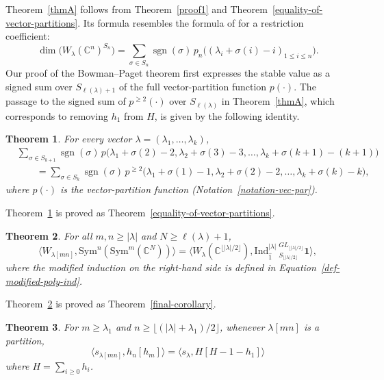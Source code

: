 \documentclass[reqno]{amsart}
\theoremstyle{plain}
\theoremstyle{definition}
\theoremstyle{remark}
\theoremstyle{plain}
\newtheorem{thmx}{Theorem}
\newcommand{\C}{\mathbb{C}}
\DeclareMathOperator{\sgn}{sgn}
\begin{document}
\noindent Theorem~\ref{thmA} follows from Theorem~\ref{proof1} and
Theorem~\ref{equality-of-vector-partitions}. Its formula resembles the formula of
\cite[Corollary~4.2]{narayanan} for a restriction coefficient:
$$\dim\big(W_\lambda(\C^n)^{S_n}\big)=\sum_{\sigma\in S_{n}}\sgn(\sigma)\,
p_n\big((\lambda_i+\sigma(i)-i)_{1\le i\le n}\big).$$
Our proof of the Bowman--Paget theorem first expresses the stable value as a
signed sum over $S_{\ell(\lambda)+1}$ of the full vector-partition function
$p(\cdot)$. The passage to the signed sum of $p^{\ge2}(\cdot)$ over
$S_{\ell(\lambda)}$ in Theorem~\ref{thmA}, which corresponds to removing $h_1$
from $H$, is given by the following identity.

\begin{thmx}\label{thmB}
For every vector $\lambda=(\lambda_1,\dots,\lambda_k)$,
\begin{align*}
&\sum_{\sigma\in S_{k+1}}\sgn(\sigma)\,
p\big(\lambda_1+\sigma(2)-2,\lambda_2+\sigma(3)-3,\dots,\lambda_k+\sigma(k+1)-(k+1)\big)\\
&\qquad=\sum_{\sigma\in S_k}\sgn(\sigma)\,
p^{\geq 2}\big(\lambda_1+\sigma(1)-1,\lambda_2+\sigma(2)-2,\dots,\lambda_k+\sigma(k)-k\big),
\end{align*}
where $p(\cdot)$ is the vector-partition function (Notation~\ref{notation-vec-par}).
\end{thmx}

\noindent Theorem~\ref{thmB} is proved as
Theorem~\ref{equality-of-vector-partitions}.

\begin{thmx}\label{thmC}
For all $m,n\ge|\lambda|$ and $N\ge\ell(\lambda)+1$,
$$\langle W_{\lambda[mn]},\mathrm{Sym}^n(\mathrm{Sym}^m(\C^N))\rangle
=\langle W_\lambda(\C^{\lfloor|\lambda|/2\rfloor}),
\mathrm{Ind}_{\hat{1}}^{|\lambda|}\ _{S_{\lfloor|\lambda|/2\rfloor}}^{GL_{\lfloor|\lambda|/2\rfloor}}\mathbf{1}\rangle,$$
where the modified induction on the right-hand side is defined in
Equation~\eqref{def-modified-poly-ind}.
\end{thmx}

\noindent Theorem~\ref{thmC} is proved as Theorem~\ref{final-corollary}.

\begin{thmx}\label{thmD}
For $m\ge\lambda_1$ and $n\ge\lfloor(|\lambda|+\lambda_1)/2\rfloor$, whenever
$\lambda[mn]$ is a partition,
$$\langle s_{\lambda[mn]}, h_n[h_m]\rangle=\langle s_\lambda,H[H-1-h_1]\rangle$$ where $H=\sum\limits_{i\ge 0 }h_i$.
\end{thmx}
\end{document}
